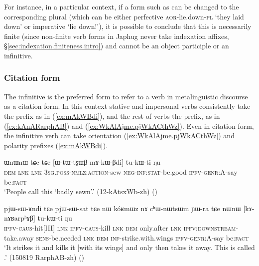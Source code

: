 For instance, in a particular context, if a form such as  can be changed to the corresponding plural  (which can be either perfective \textsc{aor}-lie.down-\textsc{pl} `they laid down' or imperative `lie down!'), it is possible to conclude that this  is necessarily finite (since non-finite verb forms in Japhug never take indexation affixes, §\ref{sec:indexation.finiteness.intro}) and cannot be an object participle or an infinitive.

\subsubsection{Citation form} \label{sec:inf.citation}
The infinitive is the preferred form to refer to a verb in metalinguistic discourse as a citation form. In this context stative and impersonal verbs consistently take the  prefix as in (\ref{ex:mAkWBdi}), and the rest of verbs the  prefix, as in (\ref{ex:kAnARarphAB}) and (\ref{ex:WkAlAjme.pjWkACthWz}). Even in citation form, the infinitive verb can take orientation (\ref{ex:WkAlAjme.pjWkACthWz}) and polarity prefixes (\ref{ex:mAkWBdi}).  

\begin{exe}
\ex  \label{ex:mAkWBdi}
 \gll ɯnɯnɯ tɕe tɕe [ɯ-tɯ-tʂɯβ mɤ-kɯ-βdi] tu-kɯ-ti ŋu \\ 
 \textsc{dem} \textsc{lnk} \textsc{lnk} \textsc{3sg}.\textsc{poss}-\textsc{nmlz}:\textsc{action}-sew \textsc{neg}-\textsc{inf}:\textsc{stat}-be.good  \textsc{ipfv}-\textsc{genr}:A-say be:\textsc{fact}  \\
\glt `People call this `badly sewn'.'  (12-kAtsxWb-zh)
()
\end{exe}

\begin{exe}
\ex \label{ex:kAnARarphAB}
 \gll  pjɯ-sɯ-ʁndi tɕe pjɯ-sɯ-sat tɕe nɯ kóʁmɯz nɤ cʰɯ-nɯtsɯm ɲɯ-ra tɕe nɯnɯ [kɤ-nɤʁarpʰɤβ] tu-kɯ-ti ŋu  \\
 \textsc{ipfv}-\textsc{caus}-hit[III]  \textsc{lnk} \textsc{ipfv}-\textsc{caus}-kill \textsc{lnk} \textsc{dem} only.after \textsc{lnk} \textsc{ipfv}:\textsc{downstream}-take.away \textsc{sens}-be.needed \textsc{lnk} \textsc{dem} \textsc{inf}-strike.with.wings \textsc{ipfv}-\textsc{genr}:A-say be:\textsc{fact}  \\
 \glt `It strikes it and kills it [with its wings] and only then takes it away. This is called .' (150819 RarphAB-zh)
()
\end{exe}


